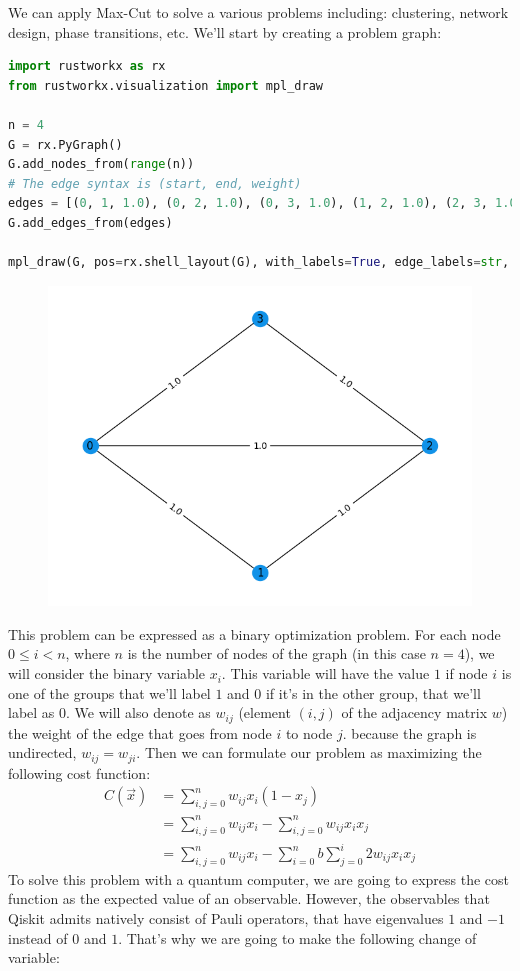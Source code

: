 \documentclass[12pt, oneside]{book}
\theoremstyle{definition}
\theoremstyle{definition}
\theoremstyle{remark}
\begin{document}
We can apply Max-Cut to solve a various problems including: clustering, network design, phase transitions, etc. We'll start by creating a problem graph:
\begin{lstlisting}[language=Python]
import rustworkx as rx
from rustworkx.visualization import mpl_draw

n = 4
G = rx.PyGraph()
G.add_nodes_from(range(n))
# The edge syntax is (start, end, weight)
edges = [(0, 1, 1.0), (0, 2, 1.0), (0, 3, 1.0), (1, 2, 1.0), (2, 3, 1.0)]
G.add_edges_from(edges)

mpl_draw(G, pos=rx.shell_layout(G), with_labels=True, edge_labels=str, node_color="#1192E8")
\end{lstlisting}
\begin{figure}[H]
    \centering
    \includegraphics[width=0.5\linewidth]{../images/graph_costexp.png}
\end{figure}
This problem can be expressed as a binary optimization problem. For each node $0\leq i<n$, where $n$ is the number of nodes of the graph (in this case $n=4$), we will consider the binary variable $x_i$. This variable will have the value $1$ if node $i$ is one of the groups that we'll label $1$ and $0$ if it's in the other group, that we'll label as 0. We will also denote as $w_{ij}$ (element $(i,j)$ of the adjacency matrix $w$) the weight of the edge that goes from node $i$ to node $j$. because the graph is undirected, $w_{ij}=w_{ji}$. Then we can formulate our problem as maximizing the following cost function:
\begin{align*}
    C(\vec{x})&=\sum_{i,j=0}^n w_{ij}x_i(1-x_j)\\
    &=\sum_{i,j=0}^n w_{ij}x_i-\sum_{i,j=0}^nw_{ij}x_ix_j\\
    &=\sum_{i,j=0}^n w_{ij}x_i-\sum_{i=0}^nb\sum_{j=0}^i 2w_{ij}x_ix_j
\end{align*}
To solve this problem with a quantum computer, we are going to express the cost function as the expected value of an observable. However, the observables that Qiskit admits natively consist of Pauli operators, that have eigenvalues $1$ and $-1$ instead of $0$ and $1$. That's why we are going to make the following change of variable:
\end{document}
